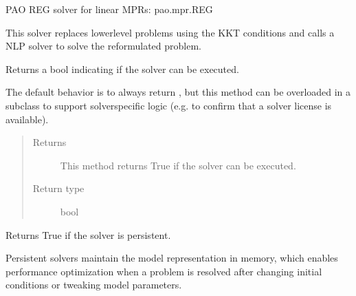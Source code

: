 \documentclass[letterpaper,10pt,english]{sphinxmanual}
\begin{document}
\begin{fulllineitems}
\label{\detokenize{reference/mpr:pao.mpr.solvers.reg.LinearMultilevelSolver_REG}}
PAO REG solver for linear MPRs: pao.mpr.REG

This solver replaces lower\sphinxhyphen{}level problems using the KKT conditions and
calls a NLP solver to solve the reformulated problem.

\begin{fulllineitems}
\label{\detokenize{reference/mpr:pao.mpr.solvers.reg.LinearMultilevelSolver_REG.available}}
Returns a bool indicating if the solver can be executed.

The default behavior is to always return , but this method
can be overloaded in a subclass to support solver\sphinxhyphen{}specific logic
(e.g.  to confirm that a solver license is available).
\begin{quote}\begin{description}
\item[{Returns}] \leavevmode
This method returns True if the solver can be executed.

\item[{Return type}] \leavevmode
bool

\end{description}\end{quote}

\end{fulllineitems}


\begin{fulllineitems}
\label{\detokenize{reference/mpr:pao.mpr.solvers.reg.LinearMultilevelSolver_REG.is_persistent}}
Returns True if the solver is persistent.

Persistent solvers maintain the model representation in memory,
which enables performance optimization when a problem is resolved
after changing initial conditions or tweaking model parameters.


\end{fulllineitems}
\end{fulllineitems}
\end{document}
